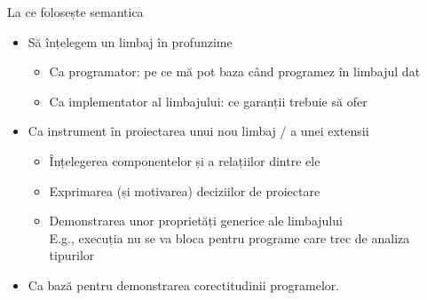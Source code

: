 \documentclass[xcolor=x11names,compress,10pt]{beamer}
\begin{document}
\begin{frame}{La ce folosește semantica}
\begin{itemize}
\item Să înțelegem un limbaj în profunzime
\begin{itemize}
\item Ca programator: pe ce mă pot baza când programez în limbajul dat
\item Ca implementator al limbajului: ce garanții trebuie să ofer
\end{itemize}
\medskip\item Ca instrument în proiectarea unui nou limbaj / a unei extensii
 \begin{itemize}
\item Înțelegerea componentelor și a relațiilor dintre ele
\item Exprimarea (și motivarea)  deciziilor de proiectare
\item Demonstrarea unor proprietăți generice ale limbajului\\
E.g., execuția nu se va bloca pentru programe care trec de analiza tipurilor
\end{itemize}
\medskip\item Ca bază pentru demonstrarea corectitudinii programelor.
\end{itemize}
\end{frame}
	
\end{document}

